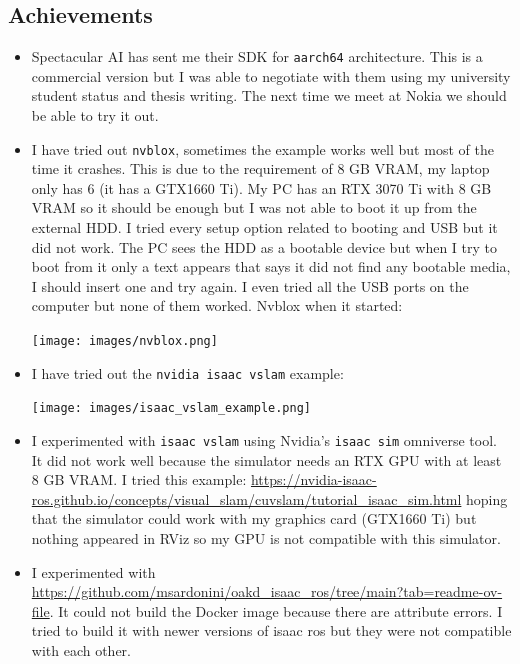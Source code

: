 \documentclass{article}
\begin{document}
\subsection{Achievements}
\begin{itemize}
    \item Spectacular AI has sent me their SDK for \verb|aarch64| architecture. This is a commercial version but I was able to negotiate with them using my university student status and thesis writing. The next time we meet at Nokia we should be able to try it out.
    \item I have tried out \verb|nvblox|, sometimes the example works well but most of the time it crashes. This is due to the requirement of 8 GB VRAM, my laptop only has 6 (it has a GTX1660 Ti). My PC has an RTX 3070 Ti with 8 GB VRAM so it should be enough but I was not able to boot it up from the external HDD. I tried every setup option related to booting and USB but it did not work. The PC sees the HDD as a bootable device but when I try to boot from it only a text appears that says it did not find any bootable media, I should insert one and try again. I even tried all the USB ports on the computer but none of them worked. Nvblox when it started:\par
    \begin{minipage}{\linewidth}
        \centering
        \texttt{[image: images/nvblox.png]}
    \end{minipage}
    \item I have tried out the \verb|nvidia isaac vslam| example:\par
    \begin{minipage}{\linewidth}
        \centering
        \texttt{[image: images/isaac\_vslam\_example.png]}
    \end{minipage}
    \item I experimented with \verb|isaac vslam| using Nvidia's \verb|isaac sim| omniverse tool. It did not work well because the simulator needs an RTX GPU with at least 8 GB VRAM. I tried this example: \url{https://nvidia-isaac-ros.github.io/concepts/visual_slam/cuvslam/tutorial_isaac_sim.html} hoping that the simulator could work with my graphics card (GTX1660 Ti) but nothing appeared in RViz so my GPU is not compatible with this simulator.
    \item I experimented with \url{https://github.com/msardonini/oakd_isaac_ros/tree/main?tab=readme-ov-file}. It could not build the Docker image because there are attribute errors. I tried to build it with newer versions of isaac ros but they were not compatible with each other.
\end{itemize}
\end{document}
